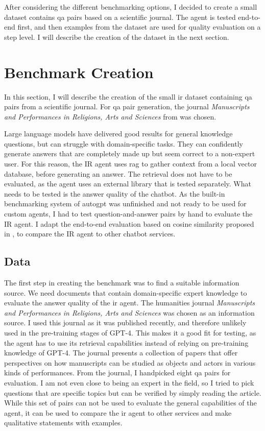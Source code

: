 \documentclass[../main.tex]{subfiles}
\begin{document}
After considering the different benchmarking options, I decided to create a small
dataset contains \gls{qa} pairs based on a scientific journal.
The agent is tested end-to-end first, and then examples from the dataset
are used for quality evaluation on a step level.
I will describe the creation of the dataset in the next section.


\section{Benchmark Creation}

In this section, I will describe the creation of the small \gls{ir} dataset
containing \gls{qa} pairs from a scientific journal.
For \gls{qa} pair generation, the journal
\emph{Manuscripts and Performances in Religions, Arts and Sciences}
from \citeauthor{Brita2023} \cite{Brita2023} was chosen.

Large language models have delivered good results for general knowledge questions,
but can struggle with domain-specific tasks.
They can confidently generate answers that are completely made up but seem correct to a non-expert user.
For this reason, the IR agent uses \gls{rag} to gather context from a local vector database,
before generating an answer.
The retrieval does not have to be evaluated, as the agent uses an external library that is tested separately.
What needs to be tested is the answer quality of the chatbot.
As the built-in benchmarking system of \gls{autogpt} was unfinished and not ready to be used for custom agents,
I had to test question-and-answer pairs by hand to evaluate the IR agent.
I adapt the end-to-end evaluation based on cosine similarity proposed in \cite{Banerjee2023},
to compare the IR agent to other chatbot services.

\subsection{Data}

The first step in creating the benchmark was to find a suitable information source.
We need documents that contain domain-specific expert knowledge
to evaluate the answer quality of the \gls{ir} agent.
The humanities journal \emph{Manuscripts and Performances in Religions, Arts and Sciences}
\citeauthor{Brita2023} \cite{Brita2023} was chosen as an information source.
I used this journal as it was published recently,
and therefore unlikely used in the pre-training stages of GPT-4.
This makes it a good fit for testing, as the agent has to use its retrieval
capabilities instead of relying on pre-training knowledge of GPT-4.
The journal presents a collection of papers that offer perspectives on how
manuscripts can be studied as objects and actors in various kinds of performances.
From the journal, I handpicked eight \gls{qa} pairs for evaluation.
I am not even close to being an expert in the field, so I tried to pick questions
that are specific topics but can be verified by simply reading the article.
While this set of pairs can not be used to evaluate the general capabilities of the agent,
it can be used to compare the \gls{ir} agent to other services
and make qualitative statements with examples.
\end{document}
